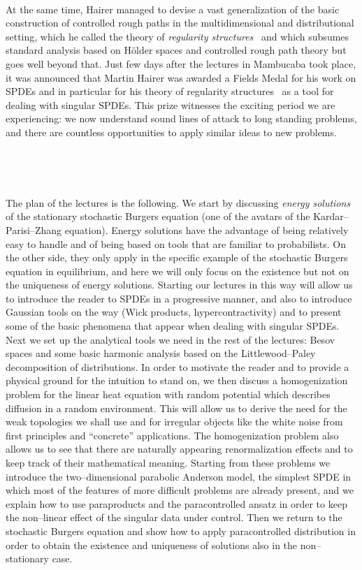 \documentclass[a4paper,11pt]{article}
\newcommand{\tmem}[1]{{\em #1\/}}
\begin{document}
\

At the same time, Hairer managed to devise a vast generalization of the basic
construction of controlled rough paths in the multidimensional and
distributional setting, which he called the theory of {\tmem{regularity
structures}}~{\cite{Hairer2014}} and which subsumes standard analysis based on
H{\"o}lder spaces and controlled rough path theory but goes well beyond that.
Just few days after the lectures in Mambucaba took place, it was announced
that Martin Hairer was awarded a Fields Medal for his work on SPDEs and in
particular for his theory of regularity structures~{\cite{Hairer2014}} as a
tool for dealing with singular SPDEs. This prize witnesses the exciting period
we are experiencing: we now understand sound lines of attack to long standing
problems, and there are countless opportunities to apply similar ideas to new
problems.

\

\

The plan of the lectures is the following. We start by discussing \emph{energy
solutions}~{\cite{goncalves_universality_2010,gubinelli_regularization_2013}} of the stationary stochastic Burgers equation (one of the avatars of the Kardar--Parisi--Zhang equation). Energy solutions have the advantage of being relatively easy to handle and of being based on tools that are familiar to probabilists. On the other side, they only apply in the specific example of the stochastic Burgers equation in equilibrium, and here we will only focus on the existence but not on the uniqueness of energy solutions. Starting our lectures in this way will allow us to introduce the reader to SPDEs in a progressive manner, and
also to introduce Gaussian tools on the way (Wick products, hypercontractivity) and to
present some of the basic phenomena that appear when dealing with singular
SPDEs. Next we set up the analytical tools we need in the rest of the
lectures: Besov spaces and some basic harmonic analysis based on the
Littlewood--Paley decomposition of distributions. In order to motivate the reader and to
provide a physical ground for the intuition to stand on, we then discuss a
homogenization problem for the linear heat equation with random potential 
which describes diffusion in a random environment.
This will allow us to derive the need for the weak topologies we shall use and
for irregular objects like the white noise from first principles and ``concrete''
applications. The homogenization problem also allows us to see that there are naturally appearing
renormalization effects and to keep track of their mathematical
meaning. Starting from these problems we introduce the two--dimensional
parabolic Anderson model, the simplest SPDE in which most of the features of
more difficult problems are already present, and we explain how to use
paraproducts and the paracontrolled ansatz in order to keep the non--linear
effect of the singular data under control. Then we return to the stochastic Burgers equation and show how to apply paracontrolled distribution in order to obtain the existence and uniqueness of solutions also in the non--stationary case.
\end{document}
